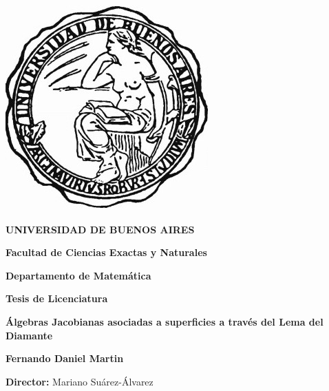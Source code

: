 
\thispagestyle{empty}

\begin {center}

\includegraphics[scale=.3]{uba2.jpg}

\medskip
\textbf{UNIVERSIDAD DE BUENOS AIRES}

\smallskip

\textbf{Facultad de Ciencias Exactas y Naturales}

\smallskip

\textbf{Departamento de Matem\'atica}

\vspace{3.5cm}

\textbf{\large Tesis de Licenciatura}


\vspace{1.5cm}

\textbf{\LARGE Álgebras Jacobianas asociadas a superficies a través del Lema del Diamante}

\vspace{1.5cm}


\textbf{\large Fernando Daniel Martin}

\end {center}


\vspace{1.5cm}

\noindent \textbf{Director:} Mariano Su\'arez-\'Alvarez


\vspace{3cm}




